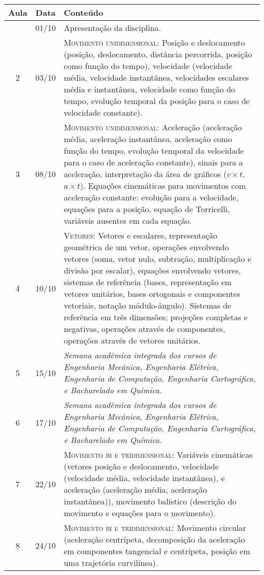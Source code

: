 \begin{center}
\begin{longtable}{ccp{70mm}}
\toprule
Aula & Data & Conteúdo \\
\midrule
\endhead
\bottomrule
\endfoot
1	 & 	01/10	 & 	Apresentação da disciplina. \\
2	 & 	03/10	 & 	\textsc{Movimento unidimensional:} Posição e deslocamento (posição, deslocamento, distância percorrida, posição como função do tempo), velocidade (velocidade média, velocidade instantânea, velocidades escalares média e instantânea, velocidade como função do tempo, evolução temporal da posição para o caso de velocidade constante). \\
3	 & 	08/10	 & 	\textsc{Movimento unidimensional:} Aceleração (aceleração média, aceleração instantânea, aceleração como função do tempo, evolução temporal da velocidade para o caso de aceleração constante), sinais para a aceleração, interpretação da área de gráficos ($v \times t$, $a \times  t$). Equações cinemáticas para movimentos com aceleração constante: evolução para a velocidade, equações para a posição, equação de Torricelli, variáveis ausentes em cada equação. \\
4	 & 	10/10	 & 	\textsc{Vetores:} Vetores e escalares, representação geométrica de um vetor, operações envolvendo vetores (soma, vetor nulo, subtração, multiplicação e divisão por escalar), equações envolvendo vetores, sistemas de referência (bases, representação em vetores unitários, bases ortogonais e componentes vetoriais, notação módulo-ângulo). Sistemas de referência em três dimensões; projeções completas e negativas, operações através de componentes, operações através de vetores unitários. \\
5	 & 	15/10	 &  \emph{Semana acadêmica integrada dos cursos de Engenharia Mecânica, Engenharia Elétrica, Engenharia de Computação, Engenharia Cartográfica, e Bacharelado em Química.} \\
6	 & 	17/10	 & 	\emph{Semana acadêmica integrada dos cursos de Engenharia Mecânica, Engenharia Elétrica, Engenharia de Computação, Engenharia Cartográfica, e Bacharelado em Química.} \\
7	 & 	22/10	 &  \textsc{Movimento bi e tridimensional:} Variáveis cinemáticas (vetores posição e deslocamento, velocidade (velocidade média, velocidade instantânea), e aceleração (aceleração média, aceleração instantânea)), movimento balístico (descrição do movimento e equações para o movimento). \\
8	 & 	24/10	 & 	\textsc{Movimento bi e tridimensional:} Movimento circular (aceleração centrípeta, decomposição da aceleração em componentes tangencial e centrípeta, posição em uma trajetória curvilínea). \\

\end{longtable}
\end{center}
